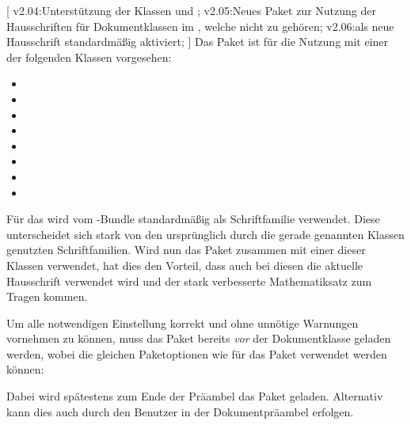 \begin{DeclareEntity}{}
[
  v2.04:Unterstützung der Klassen  und ;
  v2.05:Neues Paket zur Nutzung der Hausschriften für Dokumentklassen im 
  \TUDCD, welche nicht zu \TUDScript gehören;
  v2.06:\OpenSans als neue Hausschrift standardmäßig aktiviert;
]
Das Paket  ist für die Nutzung mit einer der folgenden 
Klassen vorgesehen:
\begin{itemize}
\item {}
\item {}
\item {}
\item {}
\item {}
\item {}
\item {}
\item {}
\end{itemize}
%
Für das \TUDCD wird vom \TUDScript-Bundle standardmäßig \OpenSans als 
Schriftfamilie verwendet. Diese unterscheidet sich stark von den ursprünglich 
durch die gerade genannten Klassen genutzten Schriftfamilien. Wird nun das 
Paket  zusammen mit einer dieser Klassen verwendet, 
hat dies den Vorteil, dass auch bei diesen die aktuelle Hausschrift verwendet 
wird und der stark verbesserte Mathematiksatz zum Tragen kommen.

Um alle notwendigen Einstellung korrekt und ohne unnötige Warnungen vornehmen 
zu können, muss das Paket  bereits \emph{vor} der 
Dokumentklasse geladen werden, wobei die gleichen Paketoptionen wie für das 
Paket  verwendet werden können:
%
\begin{quoting}[rightmargin=0pt]
\end{quoting}
%
Dabei wird spätestens zum Ende der Präambel das Paket  
geladen. Alternativ kann dies auch durch den Benutzer in der Dokumentpräambel 
erfolgen.
\end{DeclareEntity}
